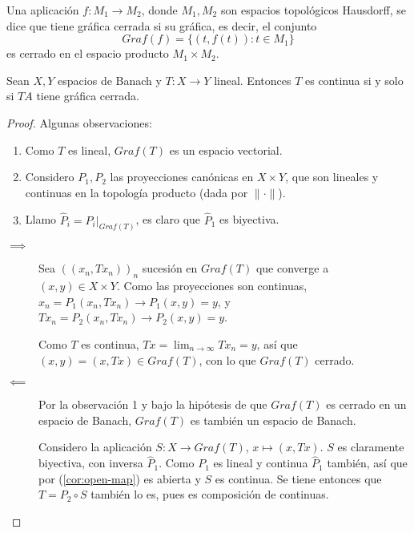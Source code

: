 \begin{definition}
  Una aplicación $f:M_1\to M_2$, donde $M_1,M_2$ son espacios topológicos
  Hausdorff, se dice que tiene gráfica cerrada si su gráfica, es decir, el
  conjunto
  \[
  Graf(f)=\{(t,f(t)):t\in M_1\} 
  \] 
  es cerrado en el espacio producto $M_1\times M_2$.
\end{definition}

\begin{theorem}
  Sean $X,Y$ espacios de Banach y $T:X\to Y$ lineal. Entonces $T$ es continua si
  y solo si $TA$ tiene gráfica cerrada.
\end{theorem}

\begin{proof}

  Algunas observaciones:

  \begin{enumerate}
    \item Como $T$ es lineal, $Graf(T)$ es un espacio vectorial.
    \item Considero $P_1,P_2$ las proyecciones canónicas en $X \times Y$, que
      son lineales y continuas en la topología producto (dada por $\|\cdot \|$).
    \item Llamo $\hat{P}_i=P_i|_{Graf(T)}$, es claro que $\hat{P}_1$ es
      biyectiva.
  \end{enumerate}

  \begin{description}
    \item[$\mathbf{\implies}$] Sea $((x_n,Tx_n))_n$ sucesión en $Graf(T)$ que
      converge a $(x,y)\in X \times Y$. Como las proyecciones son continuas,
      $x_n=P_1(x_n,Tx_n)\to P_1(x,y)=y$, y $Tx_n=P_2(x_n,Tx_n)\to P_2(x,y)=y$.

      Como $T$ es continua, $Tx = \lim_{n \to \infty} Tx_n=y$, así que
      $(x,y)=(x,Tx)\in Graf(T)$, con lo que $Graf(T)$ cerrado.

    \item[$\mathbf{\impliedby}$] Por la observación 1 y bajo la hipótesis de que
      $Graf(T)$ es cerrado en un espacio de Banach, $Graf(T)$ es también un
      espacio de Banach.

      Considero la aplicación $S:X\to Graf(T)$, $x\mapsto (x,Tx)$. $S$ es
      claramente biyectiva, con inversa $\hat{P}_1$. Como $P_1$ es lineal y
      continua $\hat{P}_1$ también, así que por (\autoref{cor:open-map}) es
      abierta y $S$ es continua. Se tiene entonces que $T=P_2\circ S$ también lo
      es, pues es composición de continuas.
  \end{description}

\end{proof}


